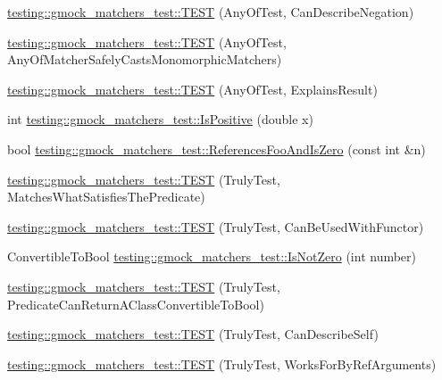 \begin{DoxyCompactItemize}
\item 
\hyperlink{namespacetesting_1_1gmock__matchers__test_acc5e849e0765f00a48581e9480f3c8e2}{testing\+::gmock\+\_\+matchers\+\_\+test\+::\+T\+E\+ST} (Any\+Of\+Test, Can\+Describe\+Negation)
\item 
\hyperlink{namespacetesting_1_1gmock__matchers__test_a8fb1598253450afeb0440682cd23999e}{testing\+::gmock\+\_\+matchers\+\_\+test\+::\+T\+E\+ST} (Any\+Of\+Test, Any\+Of\+Matcher\+Safely\+Casts\+Monomorphic\+Matchers)
\item 
\hyperlink{namespacetesting_1_1gmock__matchers__test_ad4c09014fce6029575e2c337cde85bdf}{testing\+::gmock\+\_\+matchers\+\_\+test\+::\+T\+E\+ST} (Any\+Of\+Test, Explains\+Result)
\item 
int \hyperlink{namespacetesting_1_1gmock__matchers__test_a70e728cf67d0224c3ebb9eb8959cc39d}{testing\+::gmock\+\_\+matchers\+\_\+test\+::\+Is\+Positive} (double x)
\item 
bool \hyperlink{namespacetesting_1_1gmock__matchers__test_abdce9daf2e3d3721d68f76680129f03b}{testing\+::gmock\+\_\+matchers\+\_\+test\+::\+References\+Foo\+And\+Is\+Zero} (const int \&n)
\item 
\hyperlink{namespacetesting_1_1gmock__matchers__test_ab7761562a8ffea67a485f3f649f6430a}{testing\+::gmock\+\_\+matchers\+\_\+test\+::\+T\+E\+ST} (Truly\+Test, Matches\+What\+Satisfies\+The\+Predicate)
\item 
\hyperlink{namespacetesting_1_1gmock__matchers__test_ab3e259f3ae45e199474d7c6d554852f0}{testing\+::gmock\+\_\+matchers\+\_\+test\+::\+T\+E\+ST} (Truly\+Test, Can\+Be\+Used\+With\+Functor)
\item 
Convertible\+To\+Bool \hyperlink{namespacetesting_1_1gmock__matchers__test_a248045bc57c8bad87b7d185b5c292f60}{testing\+::gmock\+\_\+matchers\+\_\+test\+::\+Is\+Not\+Zero} (int number)
\item 
\hyperlink{namespacetesting_1_1gmock__matchers__test_a24529fd7834d272009af74106422fe54}{testing\+::gmock\+\_\+matchers\+\_\+test\+::\+T\+E\+ST} (Truly\+Test, Predicate\+Can\+Return\+A\+Class\+Convertible\+To\+Bool)
\item 
\hyperlink{namespacetesting_1_1gmock__matchers__test_af474a9719e614d521c71bdf7c39f6a7a}{testing\+::gmock\+\_\+matchers\+\_\+test\+::\+T\+E\+ST} (Truly\+Test, Can\+Describe\+Self)
\item 
\hyperlink{namespacetesting_1_1gmock__matchers__test_ae702d436c52bd37fe3e8d405d7e6a691}{testing\+::gmock\+\_\+matchers\+\_\+test\+::\+T\+E\+ST} (Truly\+Test, Works\+For\+By\+Ref\+Arguments)

\end{DoxyCompactItemize}
